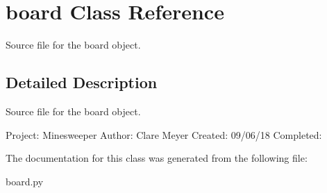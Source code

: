 \hypertarget{classboard}{}\section{board Class Reference}
\label{classboard}


Source file for the board object.  




\subsection{Detailed Description}
Source file for the board object. 

Project\+: Minesweeper Author\+: Clare Meyer Created\+: 09/06/18 Completed\+: 

The documentation for this class was generated from the following file\+:\begin{DoxyCompactItemize}
\item 
board.\+py\end{DoxyCompactItemize}

